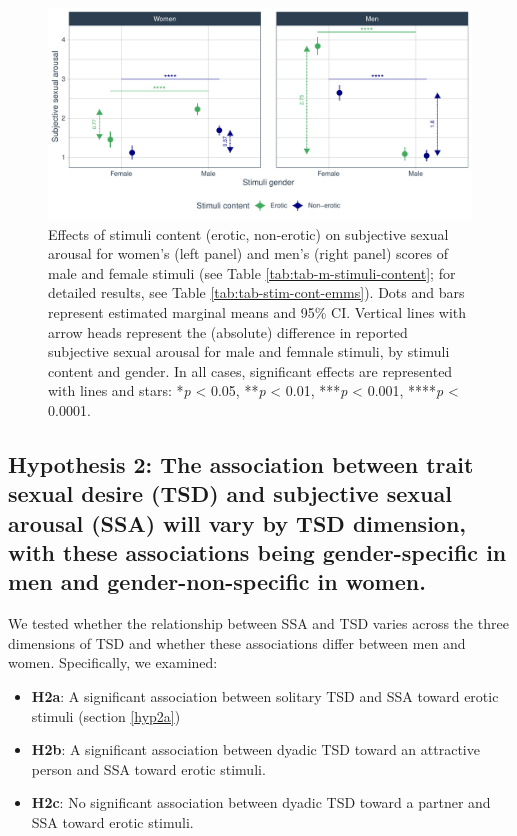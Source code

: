 \documentclass[
  bookmarksnumbered]{article}
\providecommand{\tightlist}{%
  \setlength{\itemsep}{0pt}\setlength{\parskip}{0pt}}
\begin{document}
\begin{figure}
\centering
\includegraphics{Sexual_Desire_Arousal_files/figure-latex/fig-m-stimuli-content-1.pdf}
\caption{\label{fig:fig-m-stimuli-content}Effects of stimuli content (erotic, non-erotic) on subjective sexual arousal for women's (left panel) and men's (right panel) scores of male and female stimuli (see Table \ref{tab:tab-m-stimuli-content}; for detailed results, see Table \ref{tab:tab-stim-cont-emms}). Dots and bars represent estimated marginal means and 95\% CI. Vertical lines with arrow heads represent the (absolute) difference in reported subjective sexual arousal for male and femnale stimuli, by stimuli content and gender. In all cases, significant effects are represented with lines and stars: *\emph{p} \textless{} 0.05, **\emph{p} \textless{} 0.01, ***\emph{p} \textless{} 0.001, ****\emph{p} \textless{} 0.0001.}
\end{figure}

\subsection{Hypothesis 2: The association between trait sexual desire (TSD) and subjective sexual arousal (SSA) will vary by TSD dimension, with these associations being gender-specific in men and gender-non-specific in women.}\label{hyp2}

We tested whether the relationship between SSA and TSD varies across the three dimensions of TSD and whether these associations differ between men and women. Specifically, we examined:

\begin{itemize}
\tightlist
\item
  \textbf{H2a}: A significant association between solitary TSD and SSA toward erotic stimuli (section \ref{hyp2a})
\item
  \textbf{H2b}: A significant association between dyadic TSD toward an attractive person and SSA toward erotic stimuli.
\item
  \textbf{H2c}: No significant association between dyadic TSD toward a partner and SSA toward erotic stimuli.
\end{itemize}
\end{document}
